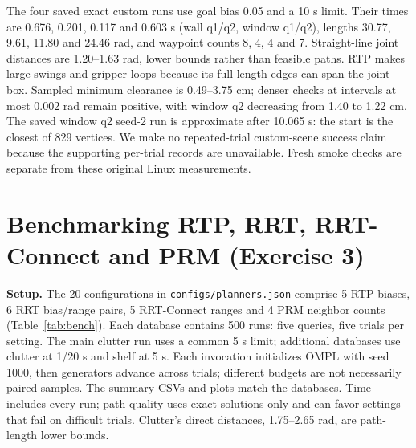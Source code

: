 \documentclass{comp450}
\begin{document}
The four saved exact custom runs use goal bias 0.05 and a 10 s limit. Their times are 0.676, 0.201, 0.117 and 0.603 s (wall q1/q2, window q1/q2), lengths 30.77, 9.61, 11.80 and 24.46 rad, and waypoint counts 8, 4, 4 and 7. Straight-line joint distances are 1.20--1.63 rad, lower bounds rather than feasible paths. RTP makes large swings and gripper loops because its full-length edges can span the joint box. Sampled minimum clearance is 0.49--3.75 cm; denser checks at intervals at most 0.002 rad remain positive, with window q2 decreasing from 1.40 to 1.22 cm. The saved window q2 seed-2 run is approximate after 10.065 s: the start is the closest of 829 vertices. We make no repeated-trial custom-scene success claim because the supporting per-trial records are unavailable. Fresh smoke checks are separate from these original Linux measurements.

\section*{Benchmarking RTP, RRT, RRT-Connect and PRM (Exercise 3)}

\textbf{Setup.} The 20 configurations in \texttt{configs/planners.json} comprise 5 RTP biases, 6 RRT bias/range pairs, 5 RRT-Connect ranges and 4 PRM neighbor counts (Table~\ref{tab:bench}). Each database contains 500 runs: five queries, five trials per setting. The main clutter run uses a common 5 s limit; additional databases use clutter at 1/20 s and shelf at 5 s. Each invocation initializes OMPL with seed 1000, then generators advance across trials; different budgets are not necessarily paired samples. The summary CSVs and plots match the databases. Time includes every run; path quality uses exact solutions only and can favor settings that fail on difficult trials. Clutter's direct distances, 1.75--2.65 rad, are path-length lower bounds.
\end{document}
